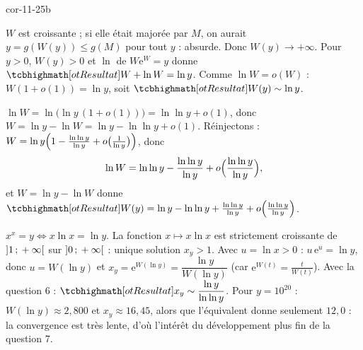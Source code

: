 \begin{blocLivre}{cor-11-25b}
\begin{corrigeSuite}
\begin{questions}[start=6]
  \item $W$ est croissante ; si elle était majorée par $M$, on aurait
    $y=g(W(y))\leqslant g(M)$ pour tout $y$ : absurde. Donc
    $W(y)\to+\infty$. Pour $y>0$, $W(y)>0$ et $\ln$ de $W\mathrm{e}^{W}=y$
    donne $\res{W+\ln W=\ln y}$. Comme $\ln W=o(W)$ :
    $W(1+o(1))=\ln y$, soit $\res{W(y)\sim\ln y}$.
  \item $\ln W=\ln\bigl(\ln y\,(1+o(1))\bigr)=\ln\ln y+o(1)$, donc
    $W=\ln y-\ln W=\ln y-\ln\ln y+o(1)$. Réinjectons :
    $W=\ln y\Bigl(1-\frac{\ln\ln y}{\ln y}+o\bigl(\tfrac{1}{\ln y}\bigr)\Bigr)$,
    donc
    \[
    \ln W=\ln\ln y-\frac{\ln\ln y}{\ln y}+o\Bigl(\frac{\ln\ln y}{\ln y}\Bigr),
    \]
    et $W=\ln y-\ln W$ donne
    $\res{W(y)=\ln y-\ln\ln y+\frac{\ln\ln y}{\ln y}+o\Bigl(\frac{\ln\ln y}{\ln y}\Bigr)}$.
  \item $x^{x}=y\iff x\ln x=\ln y$. La fonction $x\mapsto x\ln x$ est
    strictement croissante de $\mathopen{]}1\,{;}\,+\infty\mathclose{[}$ sur $\mathopen{]}0\,{;}\,+\infty\mathclose{[}$ :
    unique solution $x_y>1$. Avec $u=\ln x>0$ : $u\,\mathrm{e}^{u}=\ln y$,
    donc $u=W(\ln y)$ et
    $x_y=\mathrm{e}^{W(\ln y)}=\dfrac{\ln y}{W(\ln y)}$ (car
    $\mathrm{e}^{W(t)}=\frac{t}{W(t)}$). Avec la question 6 :
    $\res{x_y\sim\dfrac{\ln y}{\ln\ln y}}$. Pour $y=10^{20}$ :
    $W(\ln y)\approx2{,}800$ et $x_y\approx16{,}45$, alors que
    l'équivalent donne seulement $12{,}0$ : la convergence est très lente,
    d'où l'intérêt du développement plus fin de la question 7.
\end{questions}
\end{corrigeSuite}
\end{blocLivre}
